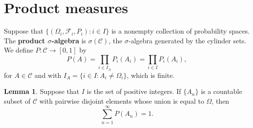 \documentclass{article}
\theoremstyle{definition}
\newtheorem{lemma}[theorem]{Lemma}
\theoremstyle{definition}
\begin{document}
\section{Product measures}
Suppose that $\{(\Omega_i,\mathscr{F}_i,P_i): i \in I\}$ is a nonempty collection of probability spaces. The \textbf{product $\sigma$-algebra} 
is $\sigma(\mathscr{C})$, the $\sigma$-algebra generated by the cylinder sets. We define $P:\mathscr{C} \to [0,1]$ by
\[
P(A) = \prod_{i \in I_A} P_i(A_i) = \prod_{i \in I} P_i(A_i),
\]
for $A \in \mathscr{C}$ and with $I_A=\{i \in I: A_i \neq \Omega_i\}$, which is finite. 

\begin{lemma}
Suppose that $I$ is the set of positive integers. If $\{A_n\}$ is a countable subset of $\mathscr{C}$ with pairwise disjoint elements whose union is equal to $\Omega$, then
\[
\sum_{n=1}^\infty P(A_n)=1.
\]
\label{countable}
\end{lemma}
\end{document}
